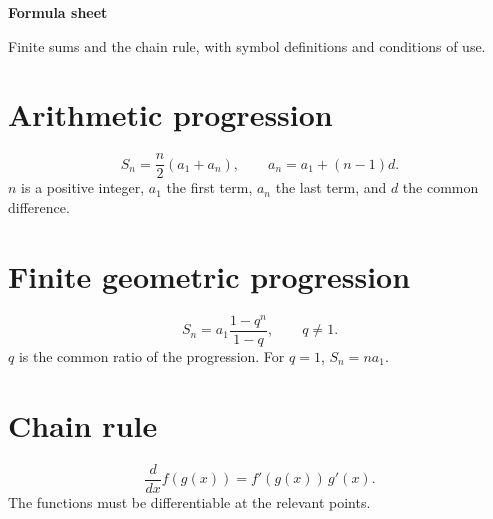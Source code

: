 \def\lakitlanguageprofile{english}
\def\lakitmainlanguage{english}
\def\lakitdocumentclass{article}
\def\lakitclassoptions{11pt,a4paper}
\def\lakitgeometryoptions{margin=2.2cm,headheight=14pt}
\def\lakitlinespread{1.18}
\def\lakitparagraphstyle{block}




{\LARGE\sffamily\bfseries\noindent Formula sheet\par}\medskip
Finite sums and the chain rule, with symbol definitions and conditions of use.
\section{Arithmetic progression}
\[
S_n=\frac{n}{2}(a_1+a_n),\qquad a_n=a_1+(n-1)d.
\]
$n$ is a positive integer, $a_1$ the first term, $a_n$ the last term, and $d$ the common difference.
\section{Finite geometric progression}
\[
S_n=a_1\frac{1-q^n}{1-q},\qquad q\neq1.
\]
$q$ is the common ratio of the progression. For $q=1$, $S_n=n a_1$.
\section{Chain rule}
\[
\frac{d}{dx}f(g(x))=f'(g(x))\,g'(x).
\]
The functions must be differentiable at the relevant points.

